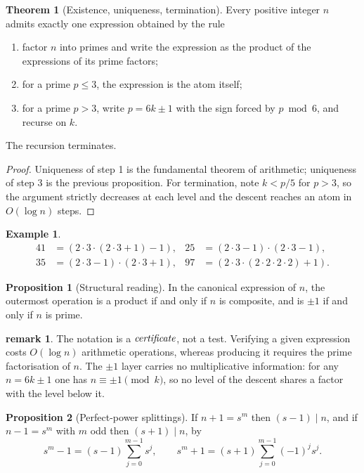 \documentclass[11pt]{article}
\theoremstyle{definition}
\newtheorem{proposition}{Proposition}
\newtheorem{theorem}{Theorem}
\newtheorem{example}{Example}
\newtheorem{remark}{remark}
\begin{document}
\begin{theorem}[Existence, uniqueness, termination]\label{thm:canonical}
Every positive integer $n$ admits exactly one expression obtained by the rule
\begin{enumerate}
  \item factor $n$ into primes and write the expression as the product of the
        expressions of its prime factors;
  \item for a prime $p \le 3$, the expression is the atom itself;
  \item for a prime $p>3$, write $p = 6k \pm 1$ with the sign forced by
        $p \bmod 6$, and recurse on $k$.
\end{enumerate}
The recursion terminates.
\end{theorem}

\begin{proof}
Uniqueness of step 1 is the fundamental theorem of arithmetic; uniqueness of
step 3 is the previous proposition. For termination, note $k < p/5$ for
$p>3$, so the argument strictly decreases at each level and the descent
reaches an atom in $O(\log n)$ steps.
\end{proof}

\begin{example}
\[
\begin{aligned}
 41 &= (2\cdot3\cdot(2\cdot3+1)-1), &
 25 &= (2\cdot3-1)\cdot(2\cdot3-1), \\
 35 &= (2\cdot3-1)\cdot(2\cdot3+1), &
 97 &= (2\cdot3\cdot(2\cdot2\cdot2\cdot2)+1).
\end{aligned}
\]
\end{example}

\begin{proposition}[Structural reading]
In the canonical expression of $n$, the outermost operation is a product if
and only if $n$ is composite, and is $\pm1$ if and only if $n$ is prime.
\end{proposition}

\begin{remark}
The notation is a $\emph{certificate}$, not a test. Verifying a given expression
costs $O(\log n)$ arithmetic operations, whereas producing it requires the
prime factorisation of $n$. The $\pm1$ layer carries no multiplicative
information: for any $n = 6k\pm1$ one has $n \equiv \pm 1 \pmod k$, so no level
of the descent shares a factor with the level below it.
\end{remark}

\begin{proposition}[Perfect-power splittings]
If $n+1 = s^m$ then $(s-1) \mid n$, and if $n-1 = s^m$ with $m$ odd then
$(s+1) \mid n$, by
\[
  s^m - 1 = (s-1)\sum_{j=0}^{m-1} s^{j}, \qquad
  s^m + 1 = (s+1)\sum_{j=0}^{m-1} (-1)^{j} s^{j}.
\]
\end{proposition}
\end{document}
